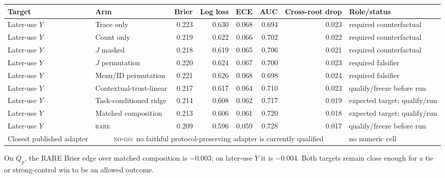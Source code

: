 \documentclass[10pt,a4paper,landscape]{article}
\newcommand{\rare}{\textsc{rare}}\newcommand{\na}{\textsc{n/a}}\newcommand{\nog}{\textsc{no-go}}\newcommand{\ok}{\textsc{pass}}
\begin{document}
\begin{center}\scriptsize\begin{tabular}{llrrrrrl}\toprule Target & Arm & Brier & Log loss & ECE & AUC & Cross-root drop & Role/status \\\midrule
Later-use $Y$ & Trace only & 0.223 & 0.630 & 0.068 & 0.694 & 0.023 & required counterfactual \\

Later-use $Y$ & Count only & 0.219 & 0.622 & 0.066 & 0.702 & 0.022 & required counterfactual \\

Later-use $Y$ & $J$ masked & 0.218 & 0.619 & 0.065 & 0.706 & 0.021 & required counterfactual \\

Later-use $Y$ & $J$ permutation & 0.220 & 0.624 & 0.067 & 0.700 & 0.023 & required falsifier \\

Later-use $Y$ & Menu/ID permutation & 0.221 & 0.626 & 0.068 & 0.698 & 0.024 & required falsifier \\

Later-use $Y$ & Contextual-trust-linear & 0.217 & 0.617 & 0.064 & 0.710 & 0.023 & qualify/freeze before run \\

Later-use $Y$ & Task-conditioned ridge & 0.214 & 0.608 & 0.062 & 0.717 & 0.019 & expected target; qualify/run \\

Later-use $Y$ & Matched composition & 0.213 & 0.606 & 0.061 & 0.720 & 0.018 & expected target; qualify/run \\

Later-use $Y$ & \rare{} & 0.209 & 0.596 & 0.059 & 0.728 & 0.017 & qualify/freeze before run \\

Closest published adapter & \multicolumn{6}{c}{\nog{}: no faithful protocol-preserving adapter is currently qualified} & no numeric cell \\
\bottomrule\end{tabular}\end{center}
On $Q_p$, the RARE Brier edge over matched composition is $-0.003$; on later-use $Y$ it is $-0.004$. Both targets remain close enough for a tie or strong-control win to be an allowed outcome.
\end{document}
